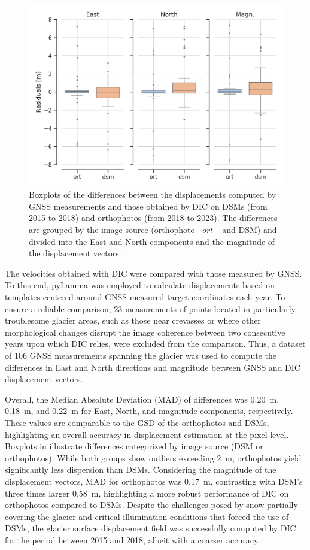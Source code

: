\begin{figure}[ht!]
    \centering
    \includegraphics[width=0.8\columnwidth]{gps_lamma_boxplot.png}
    \caption{Boxplots of the differences between the displacements computed by GNSS measurements and those obtained by DIC on DSMs (from 2015 to 2018) and orthophotos (from 2018 to 2023). The differences are grouped by the image source (orthophoto --\textit{ort} -- and DSM) and divided into the East and North components and the magnitude of the displacement vectors.}
    \label{fig:3:gps_lamma_boxplot}
\end{figure}

The velocities obtained with DIC were compared with those measured by GNSS.
To this end, pyLamma was employed to calculate displacements based on templates centered around GNSS-measured target coordinates each year. 
To ensure a reliable comparison, 23 measurements of points located in particularly troublesome glacier areas, such as those near crevasses or where other morphological changes disrupt the image coherence between two consecutive years upon which DIC relies, were excluded from the comparison.
Thus, a dataset of 106 GNSS measurements spanning the glacier was used to compute the differences in East and North directions and magnitude between GNSS and DIC displacement vectors.

Overall, the Median Absolute Deviation (MAD) of differences was \SI{0.20}{\meter}, \SI{0.18}{\meter}, and \SI{0.22}{\meter} for East, North, and magnitude components, respectively.
These values are comparable to the GSD of the orthophotos and DSMs, highlighting an overall accuracy in displacement estimation at the pixel level.
Boxplots in  illustrate differences categorized by image source (DSM or orthophotos). 
While both groups show outliers exceeding \SI{2}{\meter}, orthophotos yield significantly less dispersion than DSMs.
Considering the magnitude of the displacement vectors, MAD for orthophotos was \SI{0.17}{\meter}, contrasting with DSM's three times larger \SI{0.58}{\meter}, highlighting a more robust performance of DIC on orthophotos compared to DSMs. 
Despite the challenges posed by snow partially covering the glacier and critical illumination conditions that forced the use of DSMs, the glacier surface displacement field was successfully computed by DIC for the period between 2015 and 2018, albeit with a coarser accuracy.


